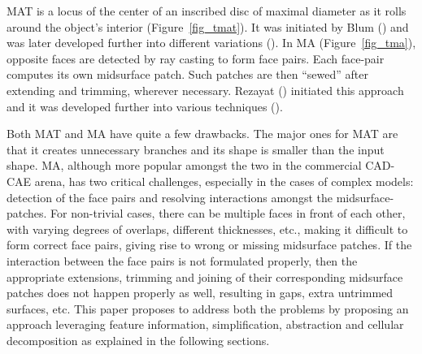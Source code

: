  MAT is a locus of the center of an inscribed disc of maximal diameter as it rolls around the object's interior (Figure~\ref{fig_tmat}). It was initiated by Blum (\cite{Harry1967}) and  was later developed further into different variations (\cite{Lam1992, Donaghy1996, Attali1997, DonaghyArmstrongPrice2000, Ramanathan2004, Robinson2006}). %
In MA  (Figure~\ref{fig_tma}), opposite faces are detected by ray casting to form face pairs.  Each face-pair computes its own  midsurface patch. Such patches are then ``sewed'' after extending and trimming, wherever necessary. Rezayat (\cite{Rezayat1996}) initiated this approach and it was developed further into various techniques (\cite{Fischer1997, Elber1999,Chong2004, Hamdi2005,Sheen2005,Stolt2006a,Lee2007,Cao2009,Sheen2010,Woo2013, Boussuge2013a}).

Both MAT and MA have quite a few drawbacks. The major ones for MAT are that it creates unnecessary branches and its shape is smaller than the input shape. MA, although more popular amongst the two in the commercial CAD-CAE arena, has two critical challenges, especially in the cases of complex models: detection of the face pairs and resolving interactions amongst the midsurface-patches. For non-trivial cases, there can  be multiple faces in front of each other, with varying degrees of overlaps, different thicknesses, etc., making it difficult to form correct face pairs, giving rise to wrong or missing midsurface patches. If the interaction between the face pairs is not formulated properly, then the appropriate extensions, trimming and joining of their corresponding midsurface patches does not happen properly as well, resulting in gaps, extra untrimmed surfaces, etc.  This paper proposes to address both the problems by proposing an approach leveraging feature information, simplification, abstraction and cellular decomposition as explained in the following sections.

